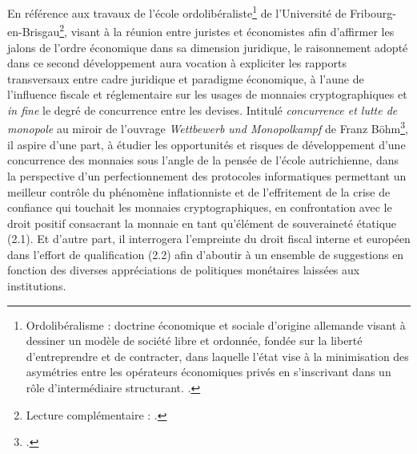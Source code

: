 {En référence aux travaux de l'école ordolibéraliste\footnote{Ordolibéralisme : doctrine économique et sociale d'origine allemande visant à dessiner un modèle de société libre et ordonnée, fondée sur la liberté d'entreprendre et de contracter, dans laquelle l'état vise à la minimisation des asymétries entre les opérateurs économiques privés en s'inscrivant dans un rôle d'intermédiaire structurant. .} de l'Université de Fribourg-en-Brisgau\footnote{Lecture complémentaire : .}, visant à la réunion entre juristes et économistes afin d'affirmer les jalons de l'ordre économique dans sa dimension juridique, le raisonnement adopté dans ce second développement aura vocation à expliciter les rapports transversaux entre cadre juridique et paradigme économique, à l'aune de l'influence fiscale et réglementaire sur les usages de monnaies cryptographiques et \emph{in fine} le degré de concurrence entre les devises. Intitulé \emph{concurrence et lutte de monopole} au miroir de l'ouvrage \emph{Wettbewerb und Monopolkampf} de Franz Böhm\footnote{.}, il aspire d'une part, à étudier les opportunités et risques de développement d'une concurrence des monnaies sous l'angle de la pensée de l'école autrichienne, dans la perspective d'un perfectionnement des protocoles informatiques permettant un meilleur contrôle du phénomène inflationniste et de l'effritement de la crise de confiance qui touchait les monnaies cryptographiques, en confrontation avec le droit positif consacrant la monnaie en tant qu'élément de souveraineté étatique (2.1). Et d'autre part, il interrogera l'empreinte du droit fiscal interne et européen dans l'effort de qualification (2.2) afin d'aboutir à un ensemble de suggestions en fonction des diverses appréciations de politiques monétaires laissées aux institutions.\par

}
